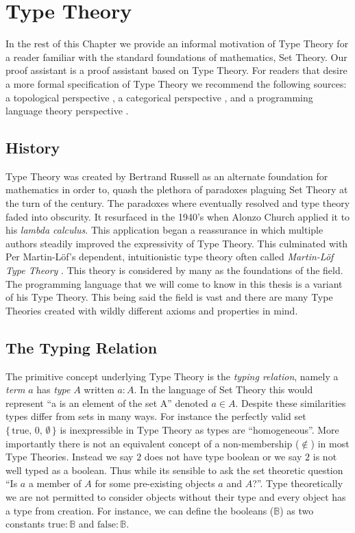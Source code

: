 \documentclass[./Thesis.tex]{subfiles}
\begin{document}
\section{Type Theory}
In the rest of this Chapter we provide an informal motivation of Type Theory for a reader
familiar with the standard foundations of mathematics, Set Theory. Our proof
assistant \Agda{} is a proof assistant based on Type Theory. For readers that
desire a more formal specification of Type Theory we recommend the following
sources: a topological perspective \cite{hott-book}, a categorical perspective
\cite{nlab}, and a programming language theory perspective \cite{harper}.
\subsection{History}
\label{sec:history}
Type Theory was created by Bertrand Russell as an alternate foundation for
mathematics in order to, quash the plethora of
paradoxes plaguing Set Theory at the turn of the century. The paradoxes
where eventually resolved and type theory faded into obscurity. It resurfaced in
the 1940's when Alonzo Church applied it to his \textit{lambda calculus}. This
application began a reassurance in which multiple authors steadily improved the
expressivity of Type Theory. This culminated with Per Martin-L\"{o}f's
dependent, intuitionistic type theory often called
\textit{Martin-L\"{o}f Type Theory} \cite{martin-lof}.
This theory is considered by many as the foundations of the field. The
programming language \Agda{} that we will come to know in this thesis is a
variant of his Type Theory. This being said the field is vast and there are many
Type Theories created with wildly different axioms and properties in mind.
\subsection{The Typing Relation}
\label{sec:typing-relation}
The primitive concept underlying Type Theory is the \textit{typing relation},
namely a \textit{term} $a$ has \textit{type} $A$ written $a : A$. In the
language of Set Theory this would represent ``a is an element of the set A''
denoted $a \in A$. Despite these similarities types differ from sets in many
ways. For instance the perfectly valid set
$\{ \, \text{true}, \, 0, \, \emptyset \, \}$
is inexpressible in Type Theory as types are ``homogeneous''. More importantly
there is not an equivalent concept of a non-membership ($\notin$) in most Type
Theories. Instead we say $2$ does not have type boolean or we say $2$ is not
well typed as a boolean. Thus while its sensible to ask the set theoretic question
``Is $a$ a member of $A$ for some pre-existing objects $a$ and $A$?''. Type
theoretically we are not permitted to consider objects without their type and
every object has a type from creation. For instance, we can define the booleans
($𝔹$) as two constants $\text{true} : 𝔹$ and $\text{false} : 𝔹$.
\end{document}
